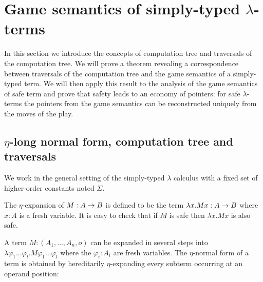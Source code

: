 \section{Game semantics of simply-typed $\lambda$-terms}

In this section we introduce the concepts of computation tree and
traversals of the computation tree. We will prove a theorem
revealing a correspondence between traversals of the computation
tree and the game semantics of a simply-typed term.
We will then apply this result to the analysis of the game semantics
of safe term and prove that safety leads to an economy of
pointers: for safe $\lambda$-terms the pointers from the game
semantics can be reconstructed uniquely from the moves of the play.


%

\subsection{$\eta$-long normal form, computation tree and traversals}
We work in the general setting of the simply-typed $\lambda$ calculus with
a fixed set of higher-order constants noted $\Sigma$.


The $\eta$-expansion of $M: A\rightarrow B$ is defined to be the term $\lambda x . M x : A\rightarrow B$ where $x:A$ is a fresh variable.
It is easy to check that if $M$ is safe then $\lambda x . M x$ is also safe.

A term $M : (A_1,\ldots,A_n,o)$ can be expanded in several steps
into $\lambda \varphi_1 \ldots \varphi_l . M \varphi_1 \ldots
\varphi_l$ where the $\varphi_i:A_i$ are fresh variables. The
$\eta$-normal form of a term is obtained by hereditarily
$\eta$-expanding every subterm occurring at an operand position:

